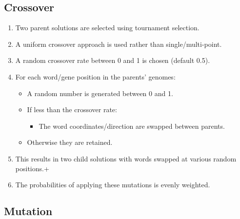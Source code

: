 \documentclass{article}
\begin{document}
\subsection*{Crossover}
\begin{enumerate}
		\item Two parent solutions are selected using tournament selection.
		\item A uniform crossover approach is used rather than single/multi-point.
		\item A random crossover rate between 0 and 1 is chosen (default 0.5).
		\item For each word/gene position in the parents' genomes:
			\begin{itemize}
					\item A random number is generated between 0 and 1.
					\item If less than the crossover rate:
					\begin{itemize}
							\item The word coordinates/direction are swapped between parents.
					\end{itemize}
					\item Otherwise they are retained.
			\end{itemize}
		\item This results in two child solutions with words swapped at various random positions.+
		\item The probabilities of applying these mutations is evenly weighted.

\end{enumerate}

\subsection*{Mutation}
\end{document}
